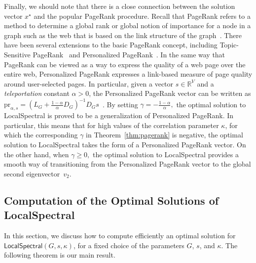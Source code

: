 \documentclass[11pt]{article}
\begin{document}
Finally, we should note that there is a close connection between the 
solution vector $x^\star$ and the popular PageRank procedure. 
Recall that PageRank refers to a method to determine a global rank or global 
notion of importance for a node in a graph such as the web that is based on 
the link structure of the graph~\cite{BP98,LM04,berkhin05_pagerank}. 
There have been several extensions to the basic PageRank concept, including 
Topic-Sensitive PageRank~\cite{haveliwala03_topicpr}
and Personalized PageRank~\cite{JW03}. 
In the same way that PageRank can be viewed as a way to express the quality 
of a web page over the entire web, Personalized PageRank expresses a 
link-based measure of page quality around user-selected pages.
In particular, given a vector $s \in \mathbb{R}^{V}$ and a 
\emph{teleportation} constant $\alpha> 0$, the Personalized PageRank vector 
can be written as
$\mbox{pr}_{\alpha,s}=\left(L_{G}+\frac{1-\alpha}{\alpha}D_{G}\right)^{-1}D_{G}s
$~\cite{andersen06local}.
By setting $\gamma = -\frac{1-\alpha}{\alpha},$  the optimal solution to \textsf{LocalSpectral} is proved to 
be a generalization of Personalized PageRank. 
In particular, this means that for high values of the correlation parameter 
$\kappa$, for which the corresponding $\gamma$ in Theorem~\ref{thm:pagerank}
is negative, the optimal solution to \textsf{LocalSpectral} takes the form 
of a Personalized PageRank vector. 
On the other hand, when $\gamma \geq 0,$ the optimal solution to 
\textsf{LocalSpectral} provides a smooth way of transitioning from the 
Personalized PageRank vector to the global second eigenvector~$v_2$.


\subsection{Computation of the Optimal Solutions of \textsf{LocalSpectral}}
\label{sxn:optimize-comp}

In this section, we discuss how to compute efficiently an optimal solution
for $\textsf{LocalSpectral}(G,s, \kappa)$, for a fixed choice of the 
parameters $G$, $s$, and $\kappa$. 
The following theorem is our main result.
\end{document}
